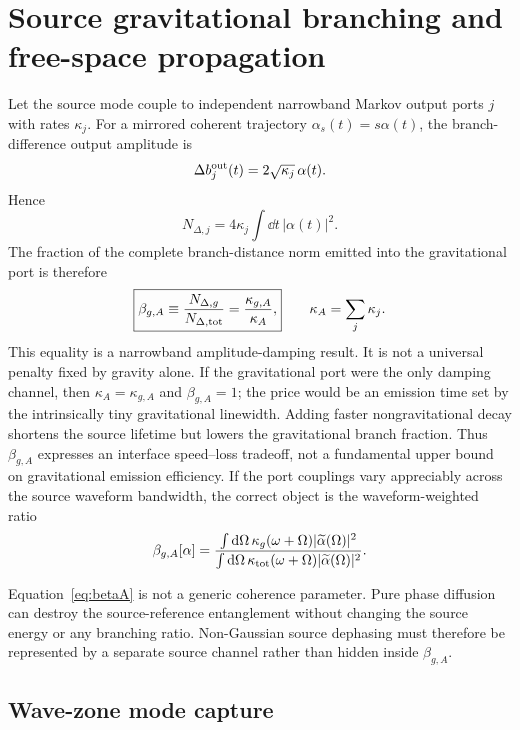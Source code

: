 \section{Source gravitational branching and free-space propagation}
\label{sec:sourceprop}

Let the source mode couple to independent narrowband Markov output ports $j$ with rates $\kappa_j$. For a mirrored coherent trajectory $\alpha_s(t)=s\alpha(t)$, the branch-difference output amplitude is
\begin{equation}
\Delta b_j^{\rm out}(t)=2\sqrt{\kappa_j}\,\alpha(t).
\end{equation}
Hence
\begin{equation}
N_{\Delta,j}=4\kappa_j\int\dd t\,|\alpha(t)|^2.
\end{equation}
The fraction of the complete branch-distance norm emitted into the gravitational port is therefore
\begin{equation}
\boxed{
\beta_{g,A}
\equiv\frac{N_{\Delta,g}}{N_{\Delta,{\rm tot}}}
=\frac{\kappa_{g,A}}{\kappa_A},}
\qquad
\kappa_A=\sum_j\kappa_j.
\label{eq:betaA}
\end{equation}
This equality is a narrowband amplitude-damping result. It is not a universal penalty fixed by gravity alone. If the gravitational port were the only damping channel, then $\kappa_A=\kappa_{g,A}$ and $\beta_{g,A}=1$; the price would be an emission time set by the intrinsically tiny gravitational linewidth. Adding faster nongravitational decay shortens the source lifetime but lowers the gravitational branch fraction. Thus $\beta_{g,A}$ expresses an interface speed--loss tradeoff, not a fundamental upper bound on gravitational emission efficiency. If the port couplings vary appreciably across the source waveform bandwidth, the correct object is the waveform-weighted ratio
\begin{equation}
\beta_{g,A}[\alpha]
=
\frac{\int\mathrm{d}\Omega\,\kappa_g(\omega+\Omega)|\widetilde\alpha(\Omega)|^2}
{\int\mathrm{d}\Omega\,\kappa_{\rm tot}(\omega+\Omega)|\widetilde\alpha(\Omega)|^2}.
\label{eq:freqbeta}
\end{equation}

Equation~\eqref{eq:betaA} is not a generic coherence parameter. Pure phase diffusion can destroy the source-reference entanglement without changing the source energy or any branching ratio. Non-Gaussian source dephasing must therefore be represented by a separate source channel rather than hidden inside $\beta_{g,A}$.

\subsection{Wave-zone mode capture}

